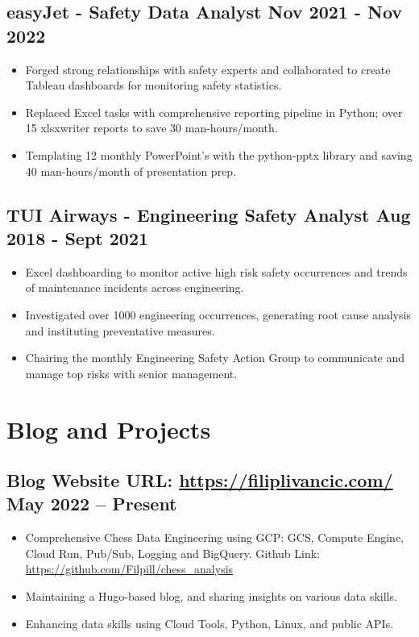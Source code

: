 \documentclass[a4paper, 9pt]{article}
\begin{document}
\subsection*{\textbf{easyJet - Safety Data Analyst} \hfill  Nov 2021 - Nov 2022}
\begin{itemize}[noitemsep]
    \item Forged strong relationships with safety experts and collaborated to create Tableau dashboards for monitoring safety statistics.
    \item Replaced Excel tasks with comprehensive reporting pipeline in Python; over 15 xlsxwriter reports to save 30 man-hours/month.
    \item Templating 12 monthly PowerPoint's with the python-pptx library and saving 40 man-hours/month of presentation prep.
\end{itemize}

\subsection*{\textbf{TUI Airways - Engineering Safety Analyst} \hfill  Aug 2018 - Sept 2021}
\begin{itemize}[noitemsep]
    \item Excel dashboarding to monitor active high risk safety occurrences and trends of maintenance incidents across engineering.
    \item Investigated over 1000 engineering occurrences, generating root cause analysis and instituting preventative measures.
    \item Chairing the monthly Engineering Safety Action Group to communicate and manage top risks with senior management.
\end{itemize}

\section*{Blog and Projects}
\vspace{-2.5mm}

\subsection*{\textbf{Blog Website URL}: \url{https://filiplivancic.com/} \hfill  May 2022 – Present}
\begin{itemize}[noitemsep]
    \item Comprehensive Chess Data Engineering using GCP: GCS, Compute Engine, Cloud Run, Pub/Sub, Logging and BigQuery. 
      \subitem Github Link: \url{https://github.com/Filpill/chess_analysis} 
\vspace{1.5mm}
    \item Maintaining a Hugo-based blog, and sharing insights on various data skills.
    \item Enhancing data skills using Cloud Tools, Python, Linux, and public APIs.
\end{itemize}
\end{document}
